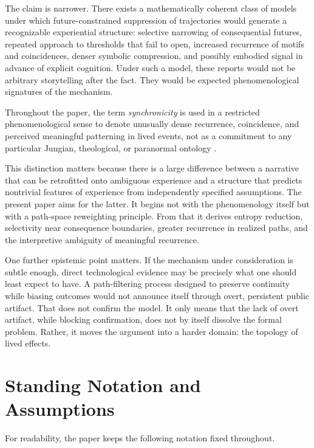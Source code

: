 \documentclass[12pt]{article}
\begin{document}
The claim is narrower. There exists a mathematically coherent class of models under which future-constrained suppression of trajectories would generate a recognizable experiential structure: selective narrowing of consequential futures, repeated approach to thresholds that fail to open, increased recurrence of motifs and coincidences, denser symbolic compression, and possibly embodied signal in advance of explicit cognition. Under such a model, these reports would not be arbitrary storytelling after the fact. They would be expected phenomenological signatures of the mechanism.

Throughout the paper, the term \emph{synchronicity} is used in a restricted phenomenological sense to denote unusually dense recurrence, coincidence, and perceived meaningful patterning in lived events, not as a commitment to any particular Jungian, theological, or paranormal ontology \cite{jung1952}.

This distinction matters because there is a large difference between a narrative that can be retrofitted onto ambiguous experience and a structure that predicts nontrivial features of experience from independently specified assumptions. The present paper aims for the latter. It begins not with the phenomenology itself but with a path-space reweighting principle. From that it derives entropy reduction, selectivity near consequence boundaries, greater recurrence in realized paths, and the interpretive ambiguity of meaningful recurrence.

One further epistemic point matters. If the mechanism under consideration is subtle enough, direct technological evidence may be precisely what one should least expect to have. A path-filtering process designed to preserve continuity while biasing outcomes would not announce itself through overt, persistent public artifact. That does not confirm the model. It only means that the lack of overt artifact, while blocking confirmation, does not by itself dissolve the formal problem. Rather, it moves the argument into a harder domain: the topology of lived effects.

\section{Standing Notation and Assumptions}

For readability, the paper keeps the following notation fixed throughout.
\end{document}
